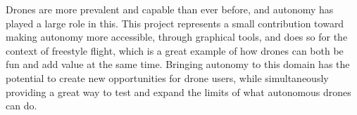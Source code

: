 \documentclass[pageno]{jpaper}
\begin{document}
Drones are more prevalent and capable than ever before, and autonomy has played a large role in this. This project represents a small contribution toward making autonomy more accessible, through graphical tools, and does so for the context of freestyle flight, which is a great example of how drones can both be fun and add value at the same time. Bringing autonomy to this domain has the potential to create new opportunities for drone users, while simultaneously providing a great way to test and expand the limits of what autonomous drones can do.




\end{document}
